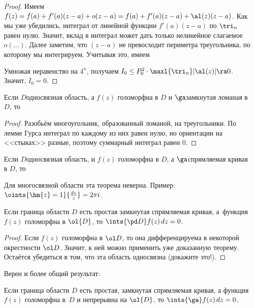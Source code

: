 \documentclass[a4paper]{article}
\begin{document}
\begin{solution}
\begin{proof}
Имеем $f(z)=f(a)+f'(a)(z-a)+o(z-a)  = f(a) + f'(a)(z-a) + \al(z)(z-a)$.
Как мы уже убедились, интеграл от линейной функции $f'(a)(z-a)$ по $\tri_n$ равен нулю. Значит, вклад
в интеграл может дать только нелинейное слагаемое $o(\dots)$. Далее заметим, что $(z-a)$ не превосходит периметра
треугольника, по которому мы интегрируем. Учитывая это, имеем


Умножая неравенство на $4^n$, получаем $I_0 \le P_0^2\cdot\maxl{\tri_n}|\al(z)| \ra 0$. Значит, $I_0 = 0$.
\end{proof}
\begin{imp}
Если $D$\т односвязная область, а $f(z)$ голоморфна в $D$ и $\ga$\т замкнутая ломаная в $D$, то
\end{imp}
\begin{proof}
Разобьём многоугольник, образованный ломаной, на треугольники. По лемме Гурса интеграл по каждому из них равен нулю,
но ориентации на <<стыках>> разные, поэтому суммарный интеграл равен $0$.
\end{proof}
\begin{imp}
Если $D$\т односвязная область, и $f(z)$ голоморфна в $D$, а $\ga$\т спрямляемая кривая в $D$, то
\end{imp}

\begin{note}
Для многосвязной области эта теорема неверна. Пример: $\oints{\hm{z} = 1}{\frac{dz}{z}} = 2\pi i$.
\end{note}

\begin{imp}
Если граница области $D$ есть простая замкнутая спрямляемая кривая, а~функция $f(z)$ голоморфна в $\ol{D}$,
то $\ints{\pd D}f(z)\,dz = 0$.
\end{imp}
\begin{proof}
Если $f(z)$ голоморфна в $\ol D$, то она дифференцируема в некоторой окрестности $\ol D$. Значит, к ней
можно применить уже доказанную теорему. Остаётся убедиться в том, что эта область односвязна (докажите это!).
\end{proof}

Верен и более общий результат:
\begin{theorem}
Если граница области $D$ есть простая, замкнутая спрямляемая кривая, а функция $f(z)$ голоморфна в~$D$ и
непрерывна на $\ol{D}$, то $\ints{\ga}f(z)\,dz = 0$.
\end{theorem}


\end{solution}
\end{document}
